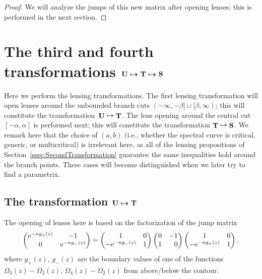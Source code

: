 \documentclass[pdftex]{sigma}
\DeclareMathOperator{\TT}{{\bf T}}
\DeclareMathOperator{\UU}{{\bf U}}
\DeclareMathOperator{\boldS}{{\bf S}}
\numberwithin{equation}{section}
\begin{document}
\begin{proof}
 We will analyze the jumps of this new matrix after opening lenses; this is performed in the next section.
\end{proof}

\section[The third and fourth transformations ${\bf U} \mapsto {\bf T} \mapsto {\bf S}$]{The third and fourth transformations $\boldsymbol{{\bf U} \mapsto {\bf T} \mapsto {\bf S}}$}\label{section5}
Here we perform the lensing transformations. The first lensing transformation will open lenses around the unbounded branch cuts
$(-\infty,-\beta] \cup [\beta,\infty)$; this will constitute the transformation~${\UU \mapsto \TT}$. The lens opening around the central cut
$[-\alpha,\alpha]$ is performed next; this will constitute the transformation $\TT\mapsto\boldS$. We remark here that the choice of $(a,b)$
(i.e., whether the spectral curve is critical, generic, or multicritical) is irrelevant here, as all of the lensing propositions of Section~\ref{ssec:SecondTransformation} guarantee
the same inequalities hold around the branch points. These cases will become distinguished when we later try to find a parametrix.

\subsection[The transformation ${\bf U} \mapsto {\bf T}$]{The transformation $\boldsymbol{{\bf U} \mapsto {\bf T}}$}
The opening of lenses here is based on the factorization of the jump matrix
 \begin{equation*}
 \begin{pmatrix}
 {\rm e}^{-ng_+(z)} & -1 \\
 0 & {\rm e}^{-n g_-(z)}
 \end{pmatrix}
 =
 \begin{pmatrix}
 1 & 0 \\
 -{\rm e}^{-n g_-(z)} & 1
 \end{pmatrix}
 \begin{pmatrix}
 0 & -1 \\
 1 & \hphantom{-} 0
 \end{pmatrix}
 \begin{pmatrix}
 1 & 0 \\
 -{\rm e}^{-n g_+(z)} & 1
 \end{pmatrix},
 \end{equation*}
where $g_+(z)$, $g_-(z)$ are the boundary values of one of the functions $\Omega_3(z) -\Omega_2(z)$, $\Omega_4(z) - \Omega_2(z)$ from above/below the contour.
\end{document}
